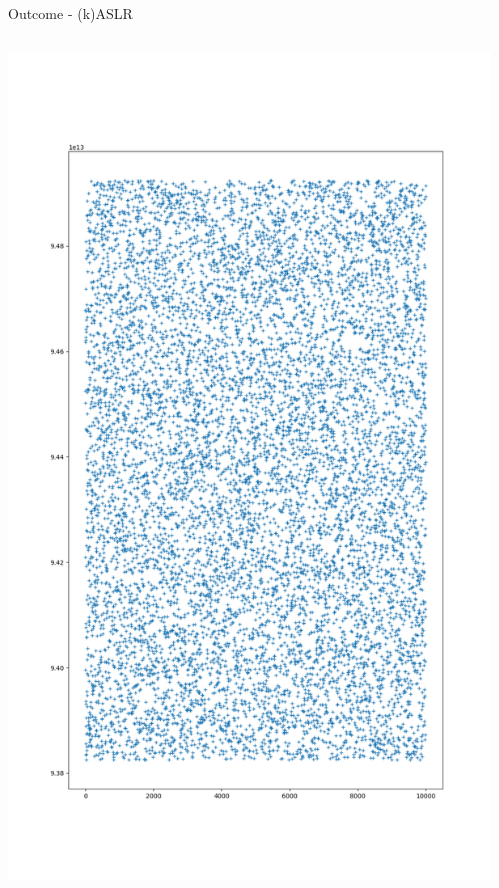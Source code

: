 \documentclass{beamer}
\begin{document}
\begin{frame}{Outcome - (k)ASLR}
    \begin{columns}
        \begin{column}{0.5\textwidth}
            \centering\includegraphics[height=.95\textheight]{Figure_1.png}
        \end{column}
        \begin{column}{.5\textwidth}

\end{column}
\end{columns}
\end{frame}
\end{document}
